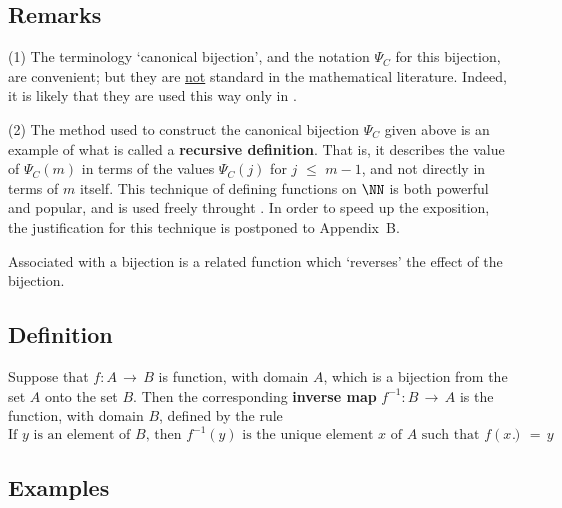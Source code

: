 {\V


        \subsection{\small{{\bf Remarks}}}
        \label{RemrkA30.80}

\V

\hspace*{\parindent}(1) The terminology `canonical bijection', and the notation ${\Psi}_{C}$ for this bijection, are convenient;
    but they are \underline{not} standard in the mathematical literature. Indeed, it is likely that they are used this way only in {\TheseNotes}.


\V

        (2) The method used to construct the canonical bijection ${\Psi}_{C}$ given above is an example of what is called a {\bf recursive definition}.
    That is, it describes the value of ${\Psi}_{C}(m)$ in terms of the values ${\Psi}_{C}(j)$ for $j\,\,{\leq}\,\,m-1$,
    and not directly in terms of $m$ itself. This technique of defining functions on ${\NN}$ is both powerful and popular,
    and is used freely throught {\TheseNotes}. In order to speed up the exposition,
    the justification for this technique is postponed to Appendix~B.


\V
\V

        Associated with a bijection is a related function which `reverses' the effect of the bijection.

        \subsection{\small{{\bf Definition}}}
        \label{DefA30.110}

        Suppose that $f:A \,{\rightarrow}\, B$ is function, with domain $A$, which is a bijection from the set $A$ onto the set $B$.
    Then the corresponding {\bf inverse map} $f^{-1}:B \,{\rightarrow}\, A$ is the function, with domain $B$, defined by the rule
        \begin{displaymath}
        \mbox{If $y$ is an element of $B$, then $f^{-1}(y)$ is the unique element $x$ of $A$ such that $f(x) \,=\, y$}.
        \end{displaymath}

\V

        \subsection{\small{{\bf Examples}}}
         \label{ExampA30.120}

}
